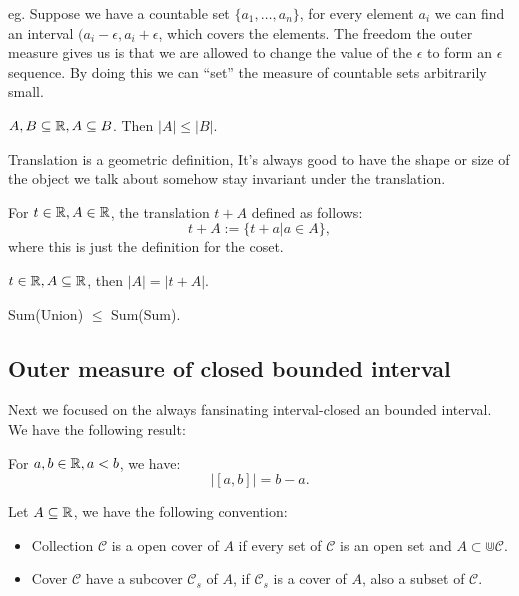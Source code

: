 \documentclass[11pt]{article}
\begin{document}
eg. Suppose we have a countable set \(\{a_1,\dots,a_n\}\), for every element \(a_i\) we can find an interval \((a_i - \epsilon, a_i + \epsilon\), which covers the elements. The freedom the outer measure gives us is that we are allowed to change the value of the \(\epsilon\) to form an \(\epsilon\) sequence. By doing this we can ``set'' the measure of countable sets arbitrarily small.

\begin{proposition}
\(A,B\subseteq \mathbb{R}, A\subseteq B\). Then \(\vert A \vert \leq \vert B \vert\).
\end{proposition}


Translation is a geometric definition, It's always good to have the shape or size of the object we talk about somehow stay invariant under the translation.

\begin{definition}[Translation]
For \(t \in \mathbb{R}, A \in \mathbb{R}\), the translation \(t + A\) defined as follows:
\[
t + A := \{t + a \vert a \in A\},
\]
where this is just the definition for the coset.
\end{definition}

\begin{proposition}
\(t \in \mathbb{R}, A \subseteq \mathbb{R}\), then \(\vert A \vert = \vert t + A \vert\).
\end{proposition}

\begin{proposition}
Sum(Union) \(\le\) Sum(Sum).
\end{proposition}
\subsection{Outer measure of closed bounded interval}
\label{sec:org8b52ff1}
Next we focused on the always fansinating interval-closed an bounded interval. We have the following result:
\begin{proposition}[ ]
For \(a,b \in \mathbb{R}, a < b\), we have:
\[
\vert [a,b] \vert = b - a.
\]
\end{proposition}

\begin{definition}
Let \(A \subseteq \mathbb{R}\), we have the following convention:
\begin{itemize}
\item Collection \(\mathcal{C}\) is a open cover of \(A\) if every set of \(\mathcal{C}\) is an open set and \(A \subset \Cup \mathcal{C}\).

\item Cover \(\mathcal{C}\) have a subcover \(\mathcal{C}_s\) of \(A\), if \(\mathcal{C}_s\) is a cover of \(A\), also a subset of \(\mathcal{C}\).
\end{itemize}
\end{definition}
\end{document}

